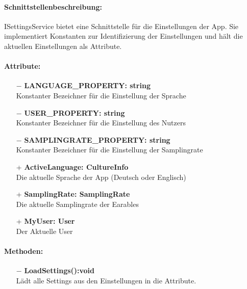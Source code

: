 \documentclass[a4paper,12pt]{article}
\begin{document}
	\paragraph{Schnittstellenbeschreibung:}
	ISettingsService bietet eine Schnittstelle für die Einstellungen der App. Sie implementiert Konstanten zur Identifizierung der Einstellungen und hält die aktuellen Einstellungen als Attribute.
	\paragraph{Attribute:}
	\begin{itemize}
		\item[$-$] \textbf{LANGUAGE\_PROPERTY: string}\\Konstanter Bezeichner für die Einstellung der Sprache \\
		\item[$-$] \textbf{USER\_PROPERTY: string}\\Konstanter Bezeichner für die Einstellung des Nutzers \\
		\item[$-$] \textbf{SAMPLINGRATE\_PROPERTY: string}\\Konstanter Bezeichner für die Einstellung der Samplingrate \\
		\item[+] \textbf{ActiveLanguage: CultureInfo}\\Die aktuelle Sprache der App (Deutsch oder Englisch)\\
		\item[+] \textbf{SamplingRate: SamplingRate}\\Die aktuelle Samplingrate der \Gls{Earables} \\ 
		\item[+] \textbf{MyUser: User}\\Der Aktuelle User\\
	\end{itemize}
	\paragraph{Methoden:}
	\begin{itemize}
		\item[$-$] \textbf{LoadSettings():void}\\Lädt alle Settings aus den Einstellungen in die Attribute.\\
		\newline
	\end{itemize}
\end{document}
